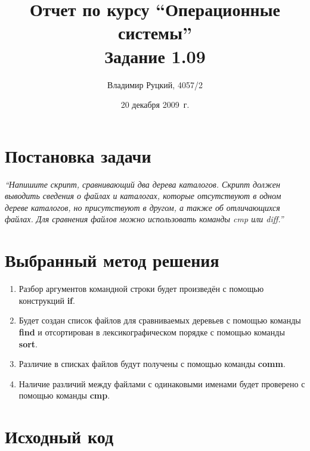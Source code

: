\documentclass[a4paper,12pt]{article}
\title{Отчет по курсу ``Операционные системы'' \\ Задание 1.09}
\author{Владимир Руцкий, 4057/2}
\date{20 декабря 2009~г.}
\newcommand{\commandquote}[1]{\textbf{#1}}
\begin{document}
\maketitle

\section*{Постановка задачи}
\textit{``Напишите скрипт, сравнивающий два дерева каталогов. Скрипт должен
выводить сведения о файлах и каталогах, которые отсутствуют в одном дереве
каталогов, но присутствуют в другом, а также об отличающихся файлах. Для
сравнения файлов можно использовать команды cmp или diff.''}

\section*{Выбранный метод решения}
\begin{enumerate}
 \item Разбор аргументов командной строки будет произведён с помощью конструкций \commandquote{if}.
 \item Будет создан список файлов для сравниваемых деревьев с помощью команды \commandquote{find} и 
отсортирован в лексикографическом порядке с помощью команды \commandquote{sort}.
 \item Различие в списках файлов будут получены с помощью команды \commandquote{comm}.
 \item Наличие различий между файлами с одинаковыми именами будет проверено с помощью команды \commandquote{cmp}.
\end{enumerate}

\pagebreak
\section*{Исходный код}
\lstset{language=bash, caption=task\_1\_09.sh,%
label=source-code, basicstyle=\footnotesize,%
numbers=left, numberstyle=\footnotesize, numbersep=5pt, frame=single, breaklines=true, breakatwhitespace=false,%
inputencoding=utf8x}

\end{document}
